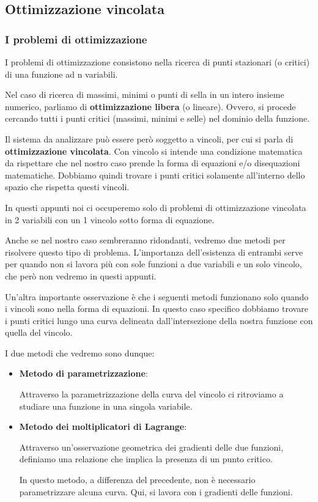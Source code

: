 \subsection{Ottimizzazione vincolata}

\subsubsection{I problemi di ottimizzazione}

I problemi di ottimizzazione consistono nella ricerca di punti stazionari (o critici) di una funzione ad n variabili.

Nel caso di ricerca di massimi, minimi o punti di sella in un intero insieme numerico, parliamo di \textbf{ottimizzazione libera} (o lineare). Ovvero, si procede cercando tutti i punti critici (massimi, minimi e selle) nel dominio della funzione.

Il sistema da analizzare può essere però soggetto a vincoli, per cui si parla di \textbf{ottimizzazione vincolata}. Con vincolo si intende una condizione matematica da rispettare che nel nostro caso prende la forma di equazioni e/o disequazioni matematiche. Dobbiamo quindi trovare i punti critici solamente all'interno dello spazio che rispetta questi vincoli.

In questi appunti noi ci occuperemo solo di problemi di ottimizzazione vincolata in 2 variabili con un 1 vincolo sotto forma di equazione.

Anche se nel nostro caso sembreranno ridondanti, vedremo due metodi per risolvere questo tipo di problema. L'importanza dell'esistenza di entrambi serve per quando non si lavora più con sole funzioni a due variabili e un solo vincolo, che però non vedremo in questi appunti.

Un'altra importante osservazione è che i seguenti metodi funzionano solo quando i vincoli sono nella forma di equazioni. In questo caso specifico dobbiamo trovare i punti critici lungo una curva delineata dall'intersezione della nostra funzione con quella del vincolo.

I due metodi che vedremo sono dunque:
\begin{itemize}
    \item \textbf{Metodo di parametrizzazione}:

          Attraverso la parametrizzazione della curva del vincolo ci ritroviamo a studiare una funzione in una singola variabile.

    \item \textbf{Metodo dei moltiplicatori di Lagrange}:

          Attraverso un'osservazione geometrica dei gradienti delle due funzioni, definiamo una relazione che implica la presenza di un punto critico.

          In questo metodo, a differenza del precedente, non è necessario parametrizzare alcuna curva. Qui, si lavora con i gradienti delle funzioni.
\end{itemize}

